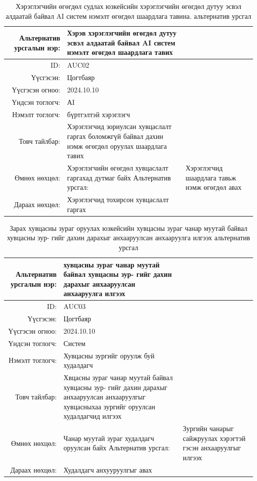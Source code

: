 \newpage
\begin{longtable}{|r|p{11.5cm}|}
    \caption{Хэрэглэгчийн өгөгдөл судлах юзкейсийн хэрэглэгчийн өгөгдөл дутуу эсвэл алдаатай байвал
AI систем нэмэлт өгөгдөл шаардлага тавина. альтернатив урсгал} 
	\label{table:alt}\\ \hline
	
	{Альтернатив урсгалын нэр:} & {Хэрэв хэрэглэгчийн өгөгдөл дутуу эсвэл алдаатай байвал
AI систем нэмэлт өгөгдөл шаардлага тавих}\\ \hline
	{ID:} & {AUC02}\\ \hline
	{Үүсгэсэн:} & {Цогтбаяр}\\ \hline
	{Үүсгэсэн огноо:} & {2024.10.10}\\ \hline
	{Үндсэн тоглогч:} & {АI}\\ \hline
	{Нэмэлт тоглогч:} & {бүртгэлтэй хэрэглэгч}\\ \hline
	{Товч тайлбар:} & {Хэрэглэгчид зориулсан хувцаслалт гаргах боломжгүй байвал дахин нэмж өгөгдөл оруулах шаардлага тавих}\\ \hline
	{Өмнөх нөхцөл:} & {Хэрэглэгчийн өгөгдөл хувцаслалт гаргахад дутмаг байх} \hline
	{Альтернатив урсгал:} & {Хэрэглэгчид шаардлага тавьж нэмж өгөгдөл авах}\\ \hline
	{Дараах нөхцөл:} & {Хэрэглэгчид тохирсон хувцаслалт гаргах}\\ \hline
\end{longtable} 
\newpage
\begin{longtable}{|r|p{11.5cm}|}
    \caption{Зарах хувцасны зураг оруулах юзкейсийн хувцасны зураг чанар муутай байвал хувцасны зур-
гийг дахин дарахыг анхааруулсан анхааруулга илгээх альтернатив урсгал} 
	\label{table:alt}\\ \hline
	
	{Альтернатив урсгалын нэр:} & {хувцасны зураг чанар муутай байвал хувцасны зур-
гийг дахин дарахыг анхааруулсан анхааруулга илгээх}\\ \hline
	{ID:} & {AUC03}\\ \hline
	{Үүсгэсэн:} & {Цогтбаяр}\\ \hline
	{Үүсгэсэн огноо:} & {2024.10.10}\\ \hline
	{Үндсэн тоглогч:} & {Систем}\\ \hline
	{Нэмэлт тоглогч:} & {Хувцасны зургийг оруулж буй худалдагч}\\ \hline
	{Товч тайлбар:} & {Хвцасны зураг чанар муутай байвал хувцасны зур-
гийг дахин дарахыг анхааруулсан анхааруулгыг хувцасныхаа зургийг оруулсан худалдагчид илгээх}\\ \hline
	{Өмнөх нөхцөл:} & {Чанар муутай зураг худалдагч оруулсан байх} \hline
	{Альтернатив урсгал:} & {Зургийн чанарыг сайжруулах хэрэгтэй гэсэн анхааруулгыг илгээх}\\ \hline
	{Дараах нөхцөл:} & {Худалдагч анхууруулгыг авах}\\ \hline
\end{longtable} 

